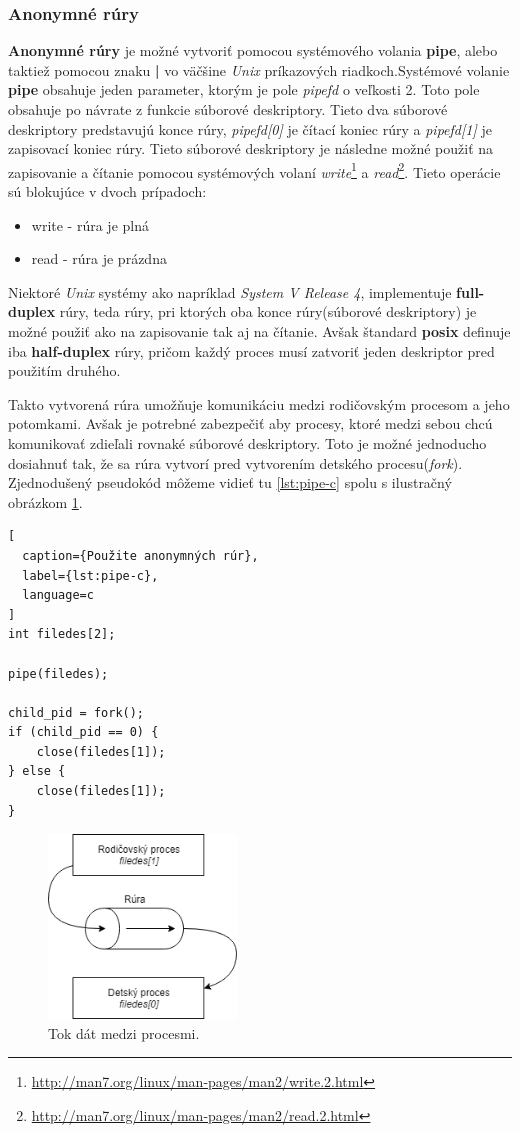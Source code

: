 \subsubsection{Anonymné rúry}
\textbf{Anonymné rúry} je možné vytvoriť pomocou systémového volania \textbf{pipe}, alebo taktiež pomocou znaku \textbf{|} vo väčšine \textit{Unix} príkazových riadkoch.Systémové volanie \textbf{pipe} obsahuje jeden parameter, ktorým je pole \textit{pipefd} o veľkosti 2. Toto pole obsahuje po návrate z funkcie súborové deskriptory. Tieto dva súborové deskriptory predstavujú konce rúry, \textit{pipefd[0]} je čítací koniec rúry a \textit{pipefd[1]} je zapisovací koniec rúry. Tieto súborové deskriptory je následne možné použiť na zapisovanie a čítanie pomocou systémových volaní \textit{write}\footnote{\url{http://man7.org/linux/man-pages/man2/write.2.html}} a \textit{read}\footnote{\url{http://man7.org/linux/man-pages/man2/read.2.html}}. Tieto operácie sú blokujúce v dvoch prípadoch:
\begin{itemize}
\item write - rúra je plná
\item read - rúra je prázdna
\end{itemize}
Niektoré \textit{Unix} systémy ako napríklad \textit{System V Release 4}, implementuje \textbf{full-duplex} rúry, teda rúry, pri ktorých oba konce rúry(súborové deskriptory) je možné použiť ako na zapisovanie tak aj na čítanie. Avšak štandard \textbf{\acrshort{posix}} definuje iba \textbf{half-duplex} rúry, pričom každý proces musí zatvoriť jeden deskriptor pred použitím druhého.\cite{linux}

Takto vytvorená rúra umožňuje komunikáciu medzi rodičovským procesom a jeho potomkami. Avšak je potrebné zabezpečiť aby procesy, ktoré medzi sebou chcú komunikovať zdieľali rovnaké súborové deskriptory. Toto je možné jednoducho dosiahnuť tak, že sa rúra vytvorí pred vytvorením detského procesu(\textit{fork}). Zjednodušený pseudokód môžeme vidieť tu \ref{lst:pipe-c} spolu s ilustračný obrázkom \ref{pipeflow}.\cite{overview}
\begin{lstlisting}[
  caption={Použite anonymných rúr},
  label={lst:pipe-c},
  language=c
]
int filedes[2];

pipe(filedes);

child_pid = fork();
if (child_pid == 0) {
	close(filedes[1]);
} else {
	close(filedes[1]);
}
\end{lstlisting}
\begin{figure}[!htbp]
  \centering
  \includegraphics[width=5cm]{img/rura.png}
  \caption{Tok dát medzi procesmi.}
  \label{pipeflow}
\end{figure}


